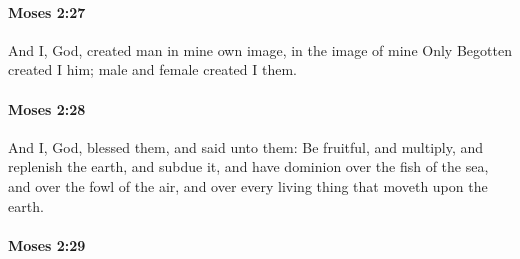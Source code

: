 
		\paragraph{Moses 2:27} %
			\label{MOSES-2-27}

			And I, God, created man in mine own image, in the image of mine Only Begotten created I him; male and female created I them.


		\paragraph{Moses 2:28} %
			\label{MOSES-2-28}

			And I, God, blessed them, and said unto them: Be fruitful, and multiply, and replenish the earth, and subdue it, and have dominion over the fish of the sea, and over the fowl of the air, and over every living thing that moveth upon the earth.


		\paragraph{Moses 2:29} %
			\label{MOSES-2-29}

